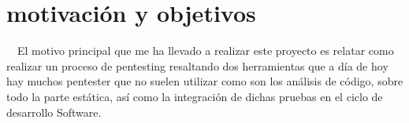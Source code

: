 \section{motivación y objetivos}

  El motivo principal que me ha llevado a realizar este proyecto es relatar como realizar un proceso 
de pentesting resaltando dos herramientas que a día de hoy hay muchos pentester que no suelen utilizar
como son los análisis de código, sobre todo la parte estática, así como la integración de dichas 
pruebas en el ciclo de desarrollo Software.
